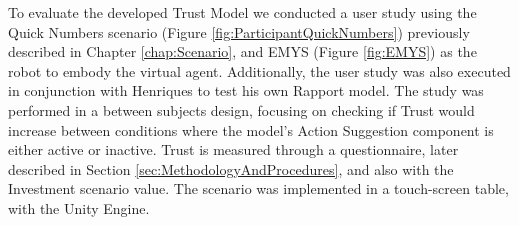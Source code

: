 \label{chap:UserStudies}
To evaluate the developed Trust Model we conducted a user study using the Quick Numbers scenario  (Figure \ref{fig:ParticipantQuickNumbers}) previously described in Chapter \ref{chap:Scenario}, and \ac{EMYS} (Figure \ref{fig:EMYS}) as the robot to embody the virtual agent. Additionally, the user study was also executed in conjunction with Henriques to test his own Rapport model. The study was performed in a between subjects design, focusing on checking if Trust would increase between conditions where the model's Action Suggestion component is either active or inactive. Trust is measured through a questionnaire, later described in Section \ref{sec:MethodologyAndProcedures}, and also with the Investment scenario value. The scenario was implemented in a touch-screen table, with the Unity Engine.

